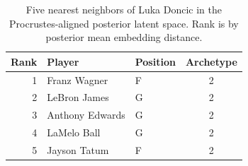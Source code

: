 \begin{table}[htbp]
  \centering\small
  \begin{tabular}{rllc}
    \toprule
    Rank & Player & Position & Archetype \\
    \midrule
    1 & Franz Wagner & F & 2 \\
    2 & LeBron James & G & 2 \\
    3 & Anthony Edwards & G & 2 \\
    4 & LaMelo Ball & G & 2 \\
    5 & Jayson Tatum & F & 2 \\
    \bottomrule
  \end{tabular}
  \caption{Five nearest neighbors of Luka Doncic in the Procrustes-aligned posterior latent space. Rank is by posterior mean embedding distance.}
  \label{tab:Luka_Doncic_neighbors}
\end{table}

